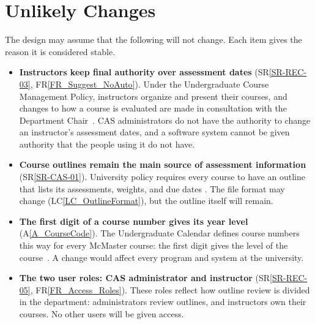 \documentclass[12pt]{article}
\newcommand{\srref}[1]{SR\ref{#1}}
\newcommand{\rref}[1]{FR\ref{#1}}
\newcounter{lcnum} %
\newcommand{\lcref}[1]{LC\ref{#1}}
\newcounter{ulcnum} %
\newcommand{\asref}[1]{A\ref{#1}}
\begin{document}
\section{Unlikely Changes} \label{sec_UnlikelyChanges}

The design may assume that the following will not change. Each item gives the
reason it is considered stable.

\noindent \begin{itemize}

\item[ULC\refstepcounter{ulcnum}\theulcnum\label{ULC_InstructorAuthority}:]
  \textbf{Instructors keep final authority over assessment dates}
  (\srref{SR-REC-03}, \rref{FR_Suggest_NoAuto}). Under the Undergraduate
  Course Management Policy, instructors organize and present their courses, and
  changes to how a course is evaluated are made in consultation with the
  Department Chair~\citep{McMasterUCMP2025}. CAS administrators do not have the
  authority to change an instructor's assessment dates, and a software system
  cannot be given authority that the people using it do not have.

\item[ULC\refstepcounter{ulcnum}\theulcnum\label{ULC_OutlineInput}:]
  \textbf{Course outlines remain the main source of assessment information}
  (\srref{SR-CAS-01}). University policy requires every course to have an
  outline that lists its assessments, weights, and due dates
  \citep{McMasterUCMP2025}. The file format may change
  (\lcref{LC_OutlineFormat}), but the outline itself will remain.

\item[ULC\refstepcounter{ulcnum}\theulcnum\label{ULC_CourseCodeConvention}:]
  \textbf{The first digit of a course number gives its year level}
  (\asref{A_CourseCode}). The Undergraduate Calendar defines course numbers
  this way for every McMaster course: the first digit gives the level of the
  course~\citep{McMasterUGCal2025}. A change would affect every program and
  system at the university.

\item[ULC\refstepcounter{ulcnum}\theulcnum\label{ULC_Roles}:] \textbf{The two
  user roles: CAS administrator and instructor} (\srref{SR-REC-05},
  \rref{FR_Access_Roles}). These roles reflect how outline review is divided in
  the department: administrators review outlines, and instructors own their
  courses. No other users will be given access.


\end{itemize}
\end{document}
